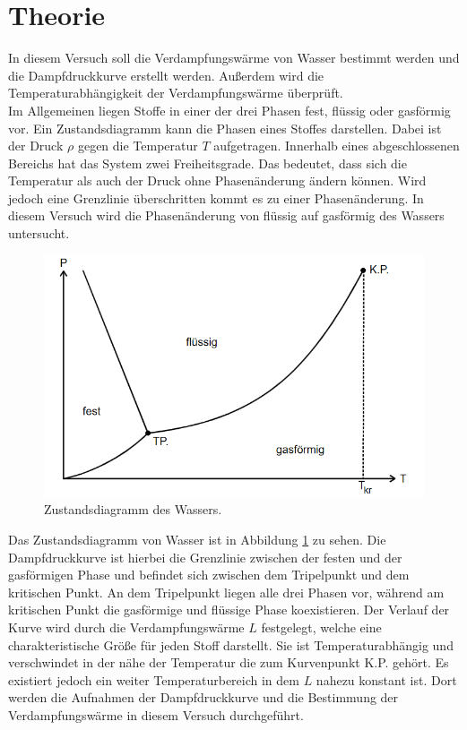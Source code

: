 \section{Theorie}
\label{sec:Theorie}
In diesem Versuch soll die Verdampfungswärme von Wasser bestimmt werden und die Dampfdruckkurve erstellt werden.
Außerdem wird die Temperaturabhängigkeit der Verdampfungswärme überprüft.
\\
Im Allgemeinen liegen Stoffe in einer der drei Phasen fest, flüssig oder gasförmig vor.
Ein Zustandsdiagramm kann die Phasen eines Stoffes darstellen. Dabei ist der Druck $\rho$ gegen die Temperatur $T$ aufgetragen. Innerhalb eines abgeschlossenen Bereichs 
hat das System zwei Freiheitsgrade. Das bedeutet, dass sich die Temperatur als auch der Druck ohne Phasenänderung ändern können. Wird jedoch eine Grenzlinie überschritten
kommt es zu einer Phasenänderung. 
In diesem Versuch wird die Phasenänderung von flüssig auf gasförmig des Wassers untersucht. 
\begin{figure}
    \centering
    \caption{Zustandsdiagramm des Wassers.\cite{v203}}
    \label{fig:zus}
    \includegraphics[width = 0.6 \textwidth]{pics/Phasendiagramm.png}
\end{figure}
Das Zustandsdiagramm von Wasser ist in Abbildung \ref{fig:zus} zu sehen. Die Dampfdruckkurve ist hierbei die Grenzlinie zwischen der festen und der gasförmigen Phase und befindet sich zwischen dem Tripelpunkt und dem kritischen Punkt.
An dem Tripelpunkt liegen alle drei Phasen vor, während am kritischen Punkt die gasförmige und flüssige Phase koexistieren. Der Verlauf der Kurve wird durch 
die Verdampfungswärme $L$ festgelegt, welche eine charakteristische Größe für jeden Stoff darstellt. Sie ist Temperaturabhängig und verschwindet in der nähe der Temperatur die
zum Kurvenpunkt K.P. gehört. Es existiert jedoch ein weiter Temperaturbereich in dem $L$ nahezu konstant ist. Dort werden die Aufnahmen der Dampfdruckkurve und die Bestimmung
der Verdampfungswärme in diesem Versuch durchgeführt. 
\\
